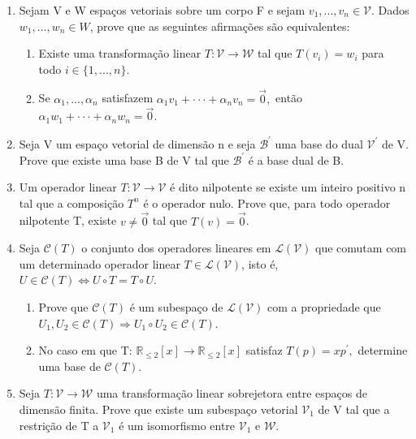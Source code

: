 \documentclass{article}
\begin{document}
\begin{enumerate}
    \item Sejam V e W espaços vetoriais sobre um corpo F e sejam $v_{1},...,v_{n}\in\mathcal{V}.$ Dados $w_{1},...,w_{n}\in W$, prove que as seguintes afirmações são equivalentes:
    \begin{enumerate}
        \item[(i)] Existe uma transformação linear $T:\mathcal{V}\rightarrow\mathcal{W}$ tal que $T(v_{i})=w_{i}$ para todo $i \in \{1,..., n\}$.
        \item[(ii)] Se $\alpha_{1},...,\alpha_{n}$ satisfazem $\alpha_{1}v_{1}+\cdot\cdot\cdot+\alpha_{n}v_{n}=\vec{0},$ então $\alpha_{1}w_{1}+\cdot\cdot\cdot+\alpha_{n}w_{n}=\vec{0}.$
    \end{enumerate}
    
    \item Seja V um espaço vetorial de dimensão n e seja $\mathcal{B}^{\prime}$ uma base do dual $\mathcal{V}^{\prime}$ de V. Prove que existe uma base B de V tal que $\mathcal{B}^{\prime}$ é a base dual de B.
    
    \item Um operador linear $T:\mathcal{V}\rightarrow\mathcal{V}$ é dito nilpotente se existe um inteiro positivo n tal que a composição $T^{n}$ é o operador nulo. Prove que, para todo operador nilpotente T, existe $v\ne\vec{0}$ tal que $T(v)=\vec{0}$.
    
    \item Seja $\mathcal{C}(T)$ o conjunto dos operadores lineares em $\mathcal{L}(\mathcal{V})$ que comutam com um determinado operador linear $T\in\mathcal{L}(\mathcal{V})$, isto é, $U\in\mathcal{C}(T)\iff U\circ T=T\circ U.$
    \begin{enumerate}
        \item[(a)] Prove que $\mathcal{C}(T)$ é um subespaço de $\mathcal{L}(\mathcal{V})$ com a propriedade que $U_{1},U_{2}\in\mathcal{C}(T)\Rightarrow U_{1}\circ U_{2}\in\mathcal{C}(T)$.
        \item[(b)] No caso em que T: $\mathbb{R}_{\le2}[x]\rightarrow\mathbb{R}_{\le2}[x]$ satisfaz $T(p)=xp^{\prime},$ determine uma base de $\mathcal{C}(T)$.
    \end{enumerate}
    
    \item Seja $T:\mathcal{V}\rightarrow\mathcal{W}$ uma transformação linear sobrejetora entre espaços de dimensão finita. Prove que existe um subespaço vetorial $\mathcal{V}_{1}$ de V tal que a restrição de T a $\mathcal{V}_{1}$ é um isomorfismo entre $\mathcal{V}_{1}$ e \(\mathcal{W}\).
    

\end{enumerate}
\end{document}
